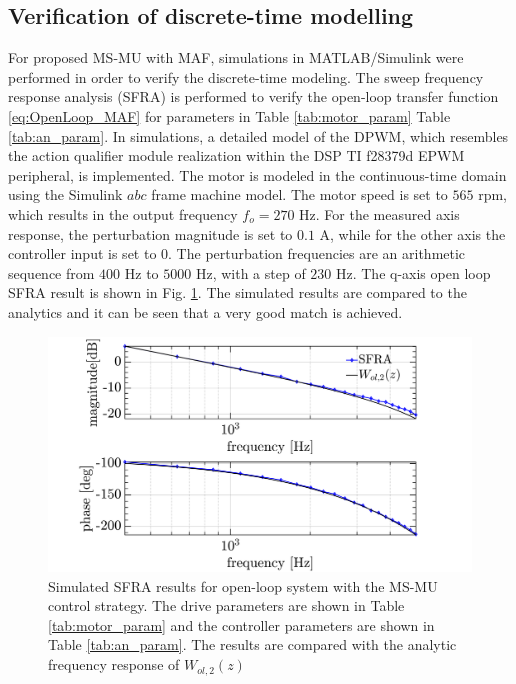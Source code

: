 \documentclass[conference]{IEEEtran}
\begin{document}
\subsection{Verification of discrete-time modelling}
For proposed MS-MU with MAF, simulations in MATLAB/Simulink were performed in order to verify the discrete-time modeling. 
The sweep frequency response analysis (SFRA) is performed to verify the open-loop transfer function \eqref{eq:OpenLoop_MAF} for parameters in Table \ref{tab:motor_param} Table \ref{tab:an_param}. In simulations, a detailed model of the DPWM, which resembles the action qualifier module realization within the DSP TI f28379d EPWM peripheral, is implemented. The motor is modeled in the continuous-time domain using the Simulink $abc$ frame machine model. The motor speed is set to $565$ rpm, which results in the output frequency $f_o = 270$ Hz.
For the measured axis response, the perturbation magnitude is set to $0.1$ A, while for the other axis the controller input is set to $0$. The perturbation frequencies are an arithmetic sequence from $400$ Hz to $5000$ Hz, with a step of $230$ Hz. The q-axis open loop SFRA result is shown in Fig. \ref{fig:MSMUmaf_olfra}. The simulated results are compared to the analytics and it can be seen that a very good match is achieved.

\begin{figure}[t!]
    \centerline{\includegraphics[width=1\linewidth]{figures/ivan figs/MSMU_OL_SFRA.png}}
    \caption{Simulated SFRA results for open-loop system with the MS-MU control strategy. The drive parameters are shown in Table \ref{tab:motor_param} and the controller parameters are shown in Table \ref{tab:an_param}. The results are compared with the analytic frequency response of $W_{ol,2}(z)$ }
    \label{fig:MSMUmaf_olfra} 
\end{figure}
\end{document}
